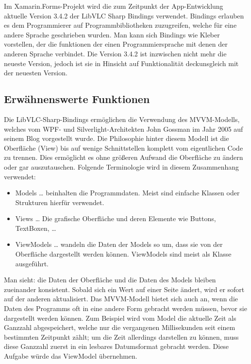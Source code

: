 Im Xamarin.Forms-Projekt wird die zum Zeitpunkt der App-Entwicklung aktuelle Version 3.4.2 der LibVLC Sharp Bindings verwendet. Bindings erlauben es dem Programmierer auf Programmbibliotheken zuzugreifen, welche für eine andere Sprache geschrieben wurden. Man kann sich Bindings wie Kleber vorstellen, der die funktionen der einen Programmiersprache mit denen der anderen Sprache verbindet. Die Version 3.4.2 ist inzwischen nicht mehr die neueste Version, jedoch  ist sie in Hinsicht auf Funktionalität deckunsgleich mit der neuesten Version.\par

\subsection{Erwähnenswerte Funktionen}
Die LibVLC-Sharp-Bindings ermöglichen die Verwendung des MVVM-Modells, welches vom WPF- und Silverlight-Architekten John Gossman im Jahr 2005 auf seinem Blog vorgestellt wurde. \cite[vlg.][The Evolution of Model-View-ViewModel]{msdoc-mvvm}
Die Philosophie hinter diesem Modell ist die Oberfläche (View) bis auf wenige Schnittstellen komplett vom eigentlichen Code zu trennen.
Dies ermöglicht es ohne größeren Aufwand die Oberfläche zu ändern oder gar auszutauschen.
Folgende Terminologie wird in diesem Zusammenhang verwendet:
\begin{itemize}
\item Models … beinhalten die Programmdaten. Meist sind einfache Klassen oder Strukturen hierfür verwendet.
\item Views … Die grafische Oberfläche und deren Elemente wie Buttons, TextBoxen, …
\item ViewModels … wandeln die Daten der Models so um, dass sie von der Oberfläche dargestellt werden können. ViewModels sind meist als Klasse ausgeführt.
\end{itemize}

Man sieht: die Daten der Oberfläche und die Daten des Models bleiben zueinander konsistent. Sobald sich ein Wert auf einer Seite ändert, wird er sofort auf der anderen aktualisiert.
Das MVVM-Modell bietet sich auch an, wenn die Daten des Programms oft in eine andere Form gebracht werden müssen, bevor sie dargestellt werden können. Zum Beispiel wird vom Model die aktuelle Zeit als Ganzzahl abgespeichert, welche nur die vergangenen Millisekunden seit einem bestimmten Zeitpunkt zählt; um die Zeit allerdings darstellen zu können, muss diese Ganzzahl zuerst in ein lesbares Datumsformat gebracht werden. Diese Aufgabe würde das ViewModel übernehmen.


